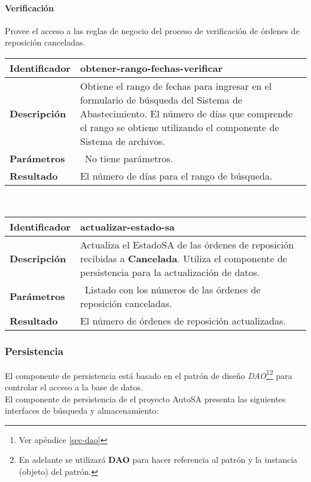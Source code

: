 \paragraph{Verificación\\}
Provee el acceso a las reglas de negocio del proceso de verificación de órdenes de reposición canceladas.
	\vspace{5mm}\\
	\begin{tabular}{|p{}|p{}|}
		\hline
		\textbf{Identificador}	& \textbf{obtener-rango-fechas-verificar}\\
		\hline
		\hline
		\textbf{Descripción}	& Obtiene el rango de fechas para ingresar en el formulario de búsqueda del Sistema de Abastecimiento. El número de días que comprende el rango se obtiene utilizando el componente de Sistema de archivos.\\
		\hline
		\textbf{Parámetros}		& \textbullet\, No tiene parámetros.\\
		\hline
		\textbf{Resultado}		& El número de días para el rango de búsqueda.\\
		\hline
	\end{tabular}
	\vspace{5mm}\\
	\begin{tabular}{|p{}|p{}|}
		\hline
		\textbf{Identificador}	& \textbf{actualizar-estado-sa}\\
		\hline
		\hline
		\textbf{Descripción}	& Actualiza el EstadoSA de las órdenes de reposición recibidas a \textbf{Cancelada}. Utiliza el componente de persistencia para la actualización de datos.\\
		\hline
		\textbf{Parámetros}		& \textbullet\, Listado con los números de las órdenes de reposición canceladas.\\
		\hline
		\textbf{Resultado}		& El número de órdenes de reposición actualizadas.\\
		\hline
	\end{tabular}
	\vspace{5mm}

\subsubsection{Persistencia}
El componente de persistencia está basado en el patrón de diseño \textit{DAO}\footnote{Ver apéndice \ref{sec-dao}}\footnote{En adelante se utilizará \textbf{DAO} para hacer referencia al patrón y la instancia (objeto) del patrón.} para controlar el acceso a la base de datos.\\
El componente de persistencia de el proyecto AutoSA presenta las siguientes interfaces de búsqueda y almacenamiento:
